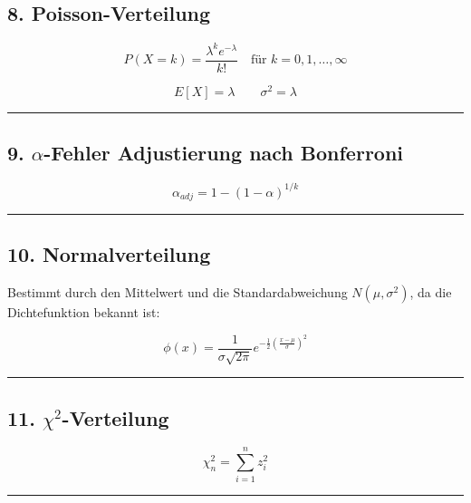 \documentclass[
]{article}
\begin{document}
\subsection{8. Poisson-Verteilung}\label{poisson-verteilung}

\[P(X = k) = \frac{\lambda^k e^{-\lambda}}{k!} \quad \text{für } k = 0, 1, \dots, \infty\]

\[E[X] = \lambda \qquad \sigma^2 = \lambda\]

\begin{center}\rule{0.5\linewidth}{0.5pt}\end{center}

\subsection{\texorpdfstring{9. \(\alpha\)-Fehler Adjustierung nach
Bonferroni}{9. \textbackslash alpha-Fehler Adjustierung nach Bonferroni}}\label{alpha-fehler-adjustierung-nach-bonferroni}

\[\alpha_{adj} = 1 - (1 - \alpha)^{1/k}\]

\begin{center}\rule{0.5\linewidth}{0.5pt}\end{center}

\subsection{10. Normalverteilung}\label{normalverteilung}

Bestimmt durch den Mittelwert und die Standardabweichung
\(N(\mu, \sigma^2)\), da die Dichtefunktion bekannt ist:

\[\phi(x) = \frac{1}{\sigma \sqrt{2\pi}} e^{-\frac{1}{2}\left(\frac{x - \mu}{\sigma}\right)^2}\]

\begin{center}\rule{0.5\linewidth}{0.5pt}\end{center}

\subsection{\texorpdfstring{11.
\(\chi^2\)-Verteilung}{11. \textbackslash chi\^{}2-Verteilung}}\label{chi2-verteilung}

\[\chi_n^2 = \sum_{i=1}^{n} z_i^2\]

\begin{center}\rule{0.5\linewidth}{0.5pt}\end{center}
\end{document}
